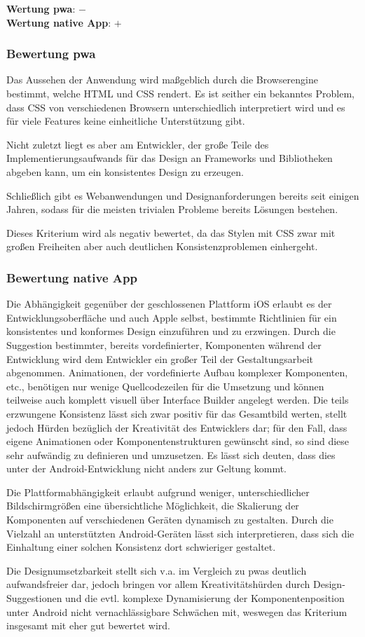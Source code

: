 \textbf{Wertung \ac{pwa}}: $-$\\
\textbf{Wertung native App}: $+$ \\

\subsubsection{Bewertung \ac{pwa}}
Das Aussehen der Anwendung wird maßgeblich durch die Browserengine bestimmt, welche HTML und CSS rendert. Es ist seither ein bekanntes Problem, dass CSS von verschiedenen Browsern unterschiedlich interpretiert wird und es für viele Features keine einheitliche Unterstützung gibt. \cite{MozillaHandlingCommonHTMLCSSProblems}

Nicht zuletzt liegt es aber am Entwickler, der große Teile des Implementierungsaufwands für das Design an Frameworks und Bibliotheken abgeben kann, um ein konsistentes Design zu erzeugen. 

Schließlich gibt es Webanwendungen und Designanforderungen bereits seit einigen Jahren, sodass für die meisten trivialen Probleme bereits Lösungen bestehen.

Dieses Kriterium wird als negativ bewertet, da das Stylen mit CSS zwar mit großen Freiheiten aber auch deutlichen Konsistenzproblemen einhergeht.

\subsubsection{Bewertung native App}
Die Abhängigkeit gegenüber der geschlossenen Plattform iOS erlaubt es der Entwicklungsoberfläche und auch Apple selbst, bestimmte Richtlinien für ein konsistentes und konformes Design einzuführen und zu erzwingen. Durch die Suggestion bestimmter, bereits vordefinierter, Komponenten während der Entwicklung wird dem Entwickler ein großer Teil der Gestaltungsarbeit abgenommen. Animationen, der vordefinierte Aufbau komplexer Komponenten, etc., benötigen nur wenige Quellcodezeilen für die Umsetzung und können teilweise auch komplett visuell über Interface Builder angelegt werden. Die teils erzwungene Konsistenz lässt sich zwar positiv für das Gesamtbild werten, stellt jedoch Hürden bezüglich der Kreativität des Entwicklers dar; für den Fall, dass eigene Animationen oder Komponentenstrukturen gewünscht sind, so sind diese sehr aufwändig zu definieren und umzusetzen. Es lässt sich deuten, dass dies unter der Android-Entwicklung nicht anders zur Geltung kommt.

Die Plattformabhängigkeit erlaubt aufgrund weniger, unterschiedlicher Bildschirmgrößen eine übersichtliche Möglichkeit, die Skalierung der Komponenten auf verschiedenen Geräten dynamisch zu gestalten. Durch die Vielzahl an unterstützten Android-Geräten lässt sich interpretieren, dass sich die Einhaltung einer solchen Konsistenz dort schwieriger gestaltet.

Die Designumsetzbarkeit stellt sich v.a. im Vergleich zu \acp{pwa} deutlich aufwandsfreier dar, jedoch bringen vor allem Kreativitätshürden durch Design-Suggestionen und die evtl. komplexe Dynamisierung der Komponentenposition unter Android nicht vernachlässigbare Schwächen mit, weswegen das Kriterium insgesamt mit eher gut bewertet wird.